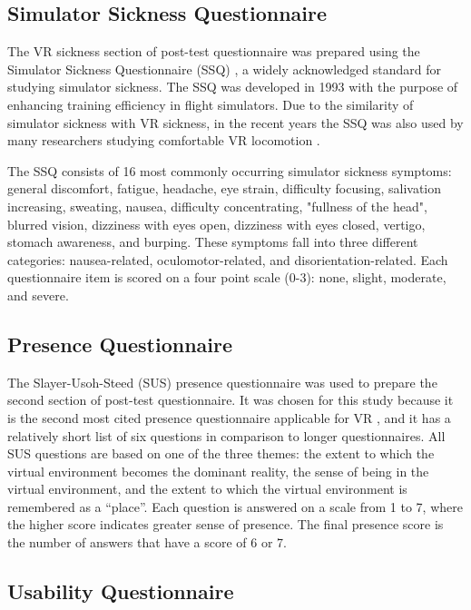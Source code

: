 \subsection{Simulator Sickness Questionnaire}

The VR sickness section of post-test questionnaire was prepared using the Simulator Sickness Questionnaire (SSQ) \cite{SSQ}, a widely acknowledged standard for studying simulator sickness. The SSQ was developed in 1993 with the purpose of enhancing training efficiency in flight simulators. Due to the similarity of simulator sickness with VR sickness, in the recent years the SSQ was also used by many researchers studying comfortable VR locomotion \cite{TELEPORTATIONEFFECTS}\cite{NODEBASEDTELEPORTATION}\cite{SUSMETHODARTICLE}.   

The SSQ consists of 16 most commonly occurring simulator sickness symptoms: general discomfort, fatigue, headache, eye strain, difficulty focusing, salivation increasing, sweating, nausea, difficulty concentrating, "fullness of the head", blurred vision, dizziness with eyes open, dizziness with eyes closed, vertigo, stomach awareness, and burping. These symptoms fall into three different categories: nausea-related, oculomotor-related, and disorientation-related. Each questionnaire item is scored on a four point scale (0-3): none, slight, moderate, and severe.  

\subsection{Presence Questionnaire}

The Slayer-Usoh-Steed (SUS) \cite{SUS} presence questionnaire was used to prepare the second section of post-test questionnaire. It was chosen for this study because it is the second most cited presence questionnaire applicable for VR \cite{SUSEVIDENCE}, and it has a relatively short list of six questions in comparison to longer questionnaires. All SUS questions are based on one of the three themes: the extent to which the virtual environment becomes the dominant reality, the sense of being in the virtual environment, and the extent to which the virtual environment is remembered as a ``place''. Each question is answered on a scale from 1 to 7, where the higher score indicates greater sense of presence. The final presence score is the number of answers that have a score of 6 or 7.

\subsection{Usability Questionnaire}

